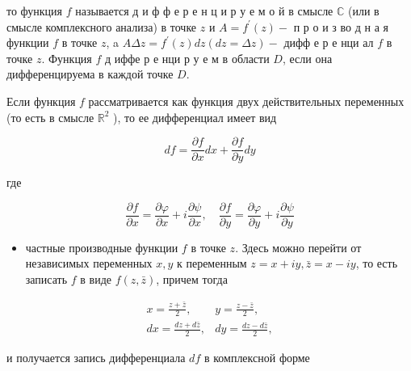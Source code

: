 \documentclass[10pt]{article}
\begin{document}
то функция $f$ называется д и ф ф е р е н ц и р у е м о й в смысле $\mathbb{C}$ (или в смысле комплексного анализа) в точке $z$ и $A=f^{\prime}(z)-$ п р о и з во д н а я функции $f$ в точке $z$, a $A \Delta z=f^{\prime}(z) d z(d z=\Delta z)-$ дифф е р е нци ал $f$ в точке $z$. Функция $f$ д иффе р е нци р у е м в области $D$, если она дифференцируема в каждой точке $D$.



Если функция $f$ рассматривается как функция двух действительных переменных (то есть в смысле $\mathbb{R}^{2}$ ), то ее дифференциал имеет вид



\[

d f=\frac{\partial f}{\partial x} d x+\frac{\partial f}{\partial y} d y

\]



где



\[

\frac{\partial f}{\partial x}=\frac{\partial \varphi}{\partial x}+i \frac{\partial \psi}{\partial x}, \quad \frac{\partial f}{\partial y}=\frac{\partial \varphi}{\partial y}+i \frac{\partial \psi}{\partial y}

\]



\begin{itemize}

  \item частные производные функции $f$ в точке $z$. Здесь можно перейти от независимых переменных $x, y$ к переменным $z=x+i y, \bar{z}=x-i y$, то есть записать $f$ в виде $f(z, \bar{z})$, причем тогда

\end{itemize}



\[

\begin{array}{cc}

x=\frac{z+\bar{z}}{2}, & y=\frac{z-\bar{z}}{2}, \\

d x=\frac{d z+d \bar{z}}{2}, & d y=\frac{d z-d \bar{z}}{2},

\end{array}

\]



и получается запись дифференциала $d f$ в комплексной форме
\end{document}
